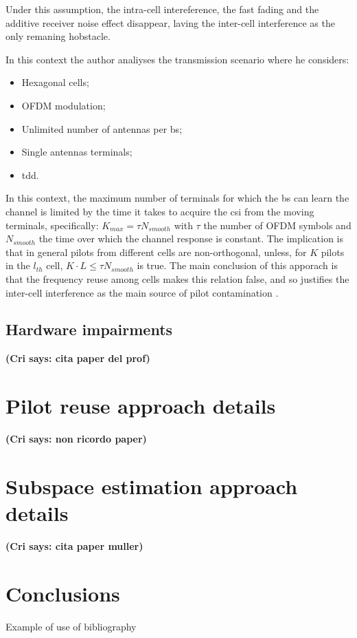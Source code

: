 \documentclass[11pt]{book}
\newcommand{\cri}[1]{\textcolor{MyColor2}{\textbf{(Cri says: #1)}}}
\begin{document}
Under this assumption, the intra-cell intereference, the fast fading and the additive receiver noise effect disappear, laving the inter-cell interference as the only remaning hobstacle.

In this context the author analiyses the transmission scenario where he considers:
\begin{itemize}
  \item Hexagonal cells;
  \item OFDM modulation;
  \item Unlimited number of antennas per \gls{bs};
  \item Single antennas terminals;
  \item \gls{tdd}.
\end{itemize}
In this context, the maximum number of terminals for which the \gls{bs} can learn the channel is limited by the time it takes to acquire the \gls{csi} from the moving terminals, specifically: $K_{max} = \tau N_{smooth}$ with $\tau$ the number of OFDM symbols and $N_{smooth}$ the time over which the channel response is constant. The implication is that in general pilots from different cells are non-orthogonal, unless, for $K$ pilots in the $l_{th}$ cell, $K\cdot L \leq \tau N_{smooth}$ is true. The main conclusion of this apporach is that the frequency reuse among cells makes this relation false, and so justifies the inter-cell interference as the main source of pilot contamination \cite{Marzetta2010}.
\subsection{Hardware impairments}

\cri{cita paper del prof}
\section{Pilot reuse approach details}
\cri{non ricordo paper}
\section{Subspace estimation approach details}
\cri{cita paper muller}
\section{Conclusions}


Example of use of bibliography  \cite{Marzetta2010}





\end{document}

